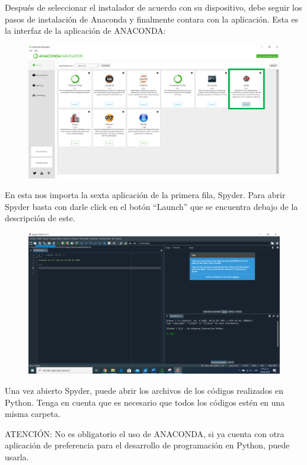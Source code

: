 \documentclass[letterpaper,12pt]{article}
\begin{document}
	Después de seleccionar el instalador de acuerdo con su dispositivo, debe seguir los pasos de instalación de Anaconda y finalmente contara con la aplicación.
	Esta es la interfaz de la aplicación de ANACONDA:
	\begin{figure}[H]
		\centering
		\includegraphics[width=0.7\linewidth]{images/anaconda4}
		\label{fig:anaconda4}
	\end{figure}
	
	En esta nos importa la sexta aplicación de la primera fila, Spyder. Para abrir Spyder basta con darle click en el botón “Launch” que se encuentra debajo de la descripción de este.
	\begin{figure}[H]
		\centering
		\includegraphics[width=0.7\linewidth]{images/anaconda5}
		\label{fig:anaconda5}
	\end{figure}
	
	Una vez abierto Spyder, puede abrir los archivos de los códigos realizados en Python. Tenga en cuenta que es necesario que todos los códigos estén en una misma carpeta.
	
	ATENCIÓN: No es obligatorio el uso de ANACONDA, si ya cuenta con otra aplicación de preferencia para el desarrollo de programación en Python, puede usarla.
	
\end{document}
